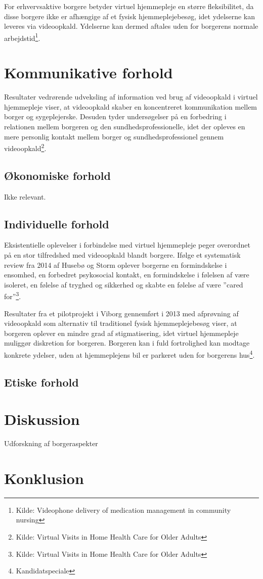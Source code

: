 For erhvervsaktive borgere betyder virtuel hjemmepleje en større fleksibilitet, da disse borgere ikke er afhængige af et fysisk hjemmeplejebesøg, idet ydelserne kan leveres via videoopkald. Ydelserne kan dermed aftales uden for borgerens normale arbejdstid\footnote{Kilde: Videophone delivery of medication management in community nursing}. 


\section{Kommunikative forhold}
Resultater vedrørende udveksling af information ved brug af videoopkald i virtuel hjemmepleje viser, at videoopkald skaber en koncentreret kommunikation mellem borger og sygeplejerske. Desuden tyder undersøgelser på en forbedring i relationen mellem borgeren og den sundhedsprofessionelle, idet der opleves en mere personlig kontakt mellem borger og sundhedsprofessionel gennem videoopkald\footnote{Kilde: Virtual Visits in Home Health Care for Older Adults}. 

\subsection{Økonomiske forhold}
Ikke relevant. 

\subsection{Individuelle forhold}
Eksistentielle oplevelser i forbindelse med virtuel hjemmepleje peger overordnet på en stor tilfredshed med videoopkald blandt borgere. Ifølge et systematisk review fra 2014 af Husebø og Storm oplever borgerne en formindskelse i ensomhed, en forbedret psykosocial kontakt, en formindskelse i følelsen af være isoleret, en følelse af tryghed og sikkerhed og skabte en følelse af være ”cared for”\footnote{Kilde: Virtual Visits in Home Health Care for Older Adults}.
 
Resultater fra et pilotprojekt i Viborg gennemført i 2013 med afprøvning af videoopkald som alternativ til traditionel fysisk hjemmeplejebesøg viser, at borgeren oplever en mindre grad af stigmatisering, idet virtuel hjemmepleje muliggør diskretion for borgeren. Borgeren kan i fuld fortrolighed kan modtage konkrete ydelser, uden at hjemmeplejens bil er parkeret uden for borgerens hus\footnote{Kandidatspeciale}.

\subsection{Etiske forhold}

\section{Diskussion}
Udforskning af borgeraspekter
\section{Konklusion}